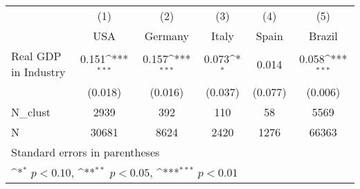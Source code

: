 {
\def\sym#1{\ifmmode^{#1}\else\(^{#1}\)\fi}
\begin{tabular}{l*{5}{c}}
\hline\hline
            &\multicolumn{1}{c}{(1)}&\multicolumn{1}{c}{(2)}&\multicolumn{1}{c}{(3)}&\multicolumn{1}{c}{(4)}&\multicolumn{1}{c}{(5)}\\
            &\multicolumn{1}{c}{USA}&\multicolumn{1}{c}{Germany}&\multicolumn{1}{c}{Italy}&\multicolumn{1}{c}{Spain}&\multicolumn{1}{c}{Brazil}\\
\hline
Real GDP in Industry&       0.151\sym{***}&       0.157\sym{***}&       0.073\sym{*}  &       0.014         &       0.058\sym{***}\\
            &     (0.018)         &     (0.016)         &     (0.037)         &     (0.077)         &     (0.006)         \\
\hline
N\_clust     &        2939         &         392         &         110         &          58         &        5569         \\
N           &       30681         &        8624         &        2420         &        1276         &       66363         \\
\hline\hline
\multicolumn{6}{l}{\footnotesize Standard errors in parentheses}\\
\multicolumn{6}{l}{\footnotesize \sym{*} \(p<0.10\), \sym{**} \(p<0.05\), \sym{***} \(p<0.01\)}\\
\end{tabular}
}
